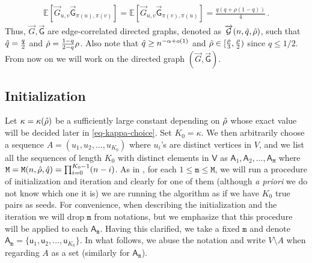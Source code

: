 \documentclass[11pt]{article}
\numberwithin{equation}{section}
\begin{document}
\begin{align*}
    \mathbb{E}[ \overrightarrow{G}_{u,v} {\overrightarrow{\mathsf{G}}_{\pi(u),\pi(v)}} ] = \mathbb{E}[ \overrightarrow{G}_{u,v} {\overrightarrow{\mathsf{G}}_{\pi(v),\pi(u)}} ]= \frac{q(q+ \rho(1-q))}{4}\,.
\end{align*}
Thus, $\overrightarrow{G},\overrightarrow{\mathsf{G}}$ are edge-correlated directed graphs, denoted as $\overrightarrow{\mathcal{G}}(n,\Hat{q},\Hat{\rho})$, such that $\Hat{q} =\frac{q}{2}$ and $\Hat{\rho}= \frac{1-q}{2-q} \rho$. Also note that $\Hat{q} \geq n^{-\alpha+o(1)}$ and $\Hat{\rho} \in [ \frac{\rho}{3} ,\frac{\rho}{2})$ since $q \leq 1/2$. From now on we will work on the directed graph  $(\overrightarrow{G}, \overrightarrow{\mathsf{G}})$.





\subsection{Initialization}\label{sec:initialization}


Let $\kappa = \kappa(\Hat{\rho})$ be a sufficiently large constant depending on $\Hat{\rho}$ whose exact value will be decided later in \eqref{eq-kappa-choice}. Set $K_0 = \kappa$. We then arbitrarily choose a sequence $A = (u_1, u_2, \ldots , u_{K_0})$ where $u_i$'s are distinct vertices in $V$, and we list all the sequences of length $K_0$ with distinct elements in $\mathsf{V}$  as $\mathsf{A}_1, \mathsf{A}_2, \ldots , \mathsf{A}_{\mathtt{M}}$ where $\mathtt{M} = \mathtt{M}(n,\Hat{\rho},\Hat{q}) = \prod_{i=0}^{K_0-1}(n-i) $. As in \cite{DL22+}, for each $1 \leq \mathtt{m} \leq \mathtt{M}$, we will run a procedure of initialization and iteration and clearly for one of them (although \emph{a priori} we do not know which one it is) we are running the algorithm as if we have $K_0$ true pairs as seeds. For convenience, when describing the initialization and the iteration we will drop $\mathtt m$ from notations, but we emphasize that this procedure will be applied to each $\mathsf A_{\mathtt m}$. Having this clarified, we take a fixed $\mathtt m$ and denote $\mathsf{A}_{\mathtt{m}} = \{ \mathsf{u}_1, \mathsf{u}_2, \ldots, \mathsf{u}_{K_0}\}$. In what follows, we abuse the notation and write $V \setminus A$ when regarding $A$ as a set (similarly for $\mathsf A_{\mathtt m}$). 
\end{document}
